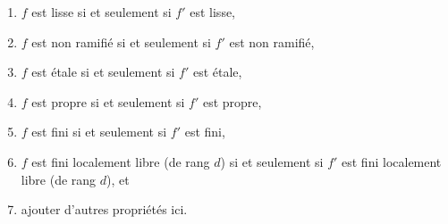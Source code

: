 \begin{lemma}
\begin{enumerate}
\label{item-syntomic-fp-over-ft}
\item $f$ est lisse si et seulement si $f'$ est lisse,
\label{item-smooth-fp-over-ft}
\item $f$ est non ramifié si et seulement si $f'$ est non ramifié,
\label{item-unramified-fp-over-ft}
\item $f$ est étale si et seulement si $f'$ est étale,
\label{item-etale-fp-over-ft}
\item $f$ est propre si et seulement si $f'$ est propre,
\label{item-proper-fp-over-ft}
\item $f$ est fini si et seulement si $f'$ est fini,
\label{item-finite-fp-over-ft}
\item
\label{item-finite-locally-free-fp-over-ft}
$f$ est fini localement libre (de rang $d$) si et seulement si $f'$
est fini localement libre (de rang $d$), et
\item ajouter d'autres propriétés ici.
\end{enumerate}
\end{lemma}

